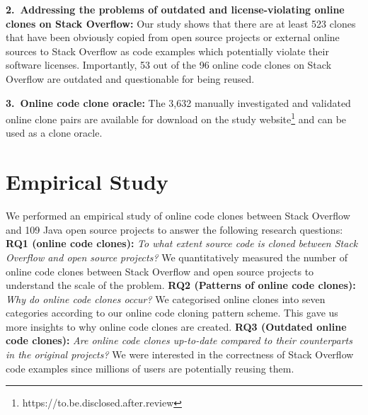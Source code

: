 \documentclass[sigconf,review, anonymous]{acmart}
\begin{document}
\vspace{0.5ex}%
\noindent\textbf{2.~Addressing the problems of outdated and license-violating online clones on Stack Overflow:} Our study shows that there are at least 523 clones that have been obviously copied from open source projects or external online sources to Stack Overflow as code examples which potentially violate their software licenses. Importantly, 53 out of the 96 online code clones on Stack Overflow are outdated and questionable for being reused.

\vspace{0.5ex}%
\noindent\textbf{3.~Online code clone oracle:} The 3,632 manually investigated and validated online clone pairs are available for download on the study website\footnote{https://to.be.disclosed.after.review} and can be used as a clone oracle.

\section{Empirical Study}
We performed an empirical study of online code clones between Stack Overflow and 109 Java open source projects to answer the following research questions: \\ 
\textbf{RQ1 (online code clones):} \textit{To what extent  source code is cloned between Stack Overflow and open source projects?} We quantitatively measured the number of online code clones between Stack Overflow and open source projects to understand the scale of the problem. \newline
\textbf{RQ2 (Patterns of online code clones):} \textit{Why do online code clones occur?} We categorised online clones into seven categories according to our online code cloning pattern scheme. This gave us more insights to why online code clones are created. %
\newline
\textbf{RQ3 (Outdated online code clones):} \textit{Are online code clones up-to-date compared to their counterparts in the original projects?} We were interested in the correctness of Stack Overflow code examples since millions of users are potentially reusing them.  %
\end{document}
